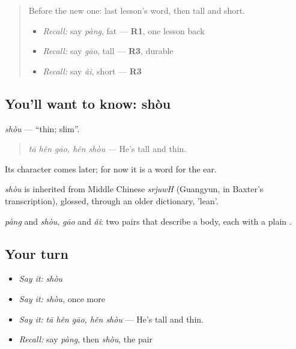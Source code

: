 \label{lesson:ZH-C94-shou}



\begin{quote}
Before the new one: last lesson's word, then tall and short.

\begin{itemize}
\raggedright
  \item \emph{Recall:} say \emph{pàng}, fat — \textbf{R1}, one lesson back
  \item \emph{Recall:} say \emph{gāo}, tall — \textbf{R3}, durable
  \item \emph{Recall:} say \emph{ǎi}, short — \textbf{R3}
\end{itemize}
\end{quote}

\subsection*{You'll want to know: shòu}
\emph{shòu} — \textquotedblleft{}thin; slim\textquotedblright{}.

\begin{quote}
\emph{tā hěn gāo, hěn shòu} — He's tall and thin.
\end{quote}

Its character comes later; for now it is a word for the ear.

\begin{cousinweb}
\emph{shòu} is inherited from Middle Chinese \emph{srjuwH} (Guangyun, in Baxter's transcription), glossed, through an older dictionary, 'lean'.
\end{cousinweb}

\begin{grammarlens}[title={What you've built}]
\emph{pàng} and \emph{shòu}, \emph{gāo} and \emph{ǎi}: two pairs that describe a body, each with a plain .
\end{grammarlens}

\subsection*{Your turn}
\begin{itemize}
\raggedright
  \item \emph{Say it:} \emph{shòu}
  \item \emph{Say it:} \emph{shòu}, once more
  \item \emph{Say it:} \emph{tā hěn gāo, hěn shòu} — He's tall and thin.
  \item \emph{Recall:} say \emph{pàng}, then \emph{shòu}, the pair
\end{itemize}

